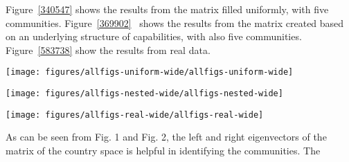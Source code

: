 \documentclass{pnastwo}
\begin{document}
\begin{article}
Figure~{\ref{340547}} shows the results from the matrix
filled uniformly, with five communities.
Figure~{\ref{369902}} ~shows the results from the
matrix created based on an underlying structure of capabilities, with
also five communities. Figure~{\ref{583738}} show the
results from real data.

\par\null{}
\begin{figure*}[h]
\begin{center}
\texttt{[image: figures/allfigs-uniform-wide/allfigs-uniform-wide]}
\caption{{Example of a matrix connecting countries with products with a uniform
probability. The within-community probability was set at 0.6 and the
between-community probability at 0.1.
{\label{340547}}%
}}
\end{center}
\end{figure*}
\begin{figure*}[h]
\begin{center}
\texttt{[image: figures/allfigs-nested-wide/allfigs-nested-wide]}
\caption{{Example of a matrix connecting countries with products as it results
from the interaction between the matrix of countries and capabilities,
with the matrix of products and the capabilities required. Within each
community we model a nested pattern in which some countries have many
capabilities and others only a few. We also include the possibility in
which some products can be produced countries regardless of the
community to which they belong.~
{\label{369902}}%
}}
\end{center}
\end{figure*}
\begin{figure*}[h]
\begin{center}
\texttt{[image: figures/allfigs-real-wide/allfigs-real-wide]}
\caption{{The same exercise as in Figures 1 and 2, but with real data from 2015
using only exporters and their products (see
Fig.~{\ref{660559}} for exporters vs.
importer-products). As can be seen, communities are less clear in this
representation.
{\label{583738}}%
}}
\end{center}
\end{figure*}

As can be seen from Fig. 1 and Fig. 2, the left and right eigenvectors
of the matrix of the country space is helpful in identifying the
communities. The~


\end{article}
\end{document}
